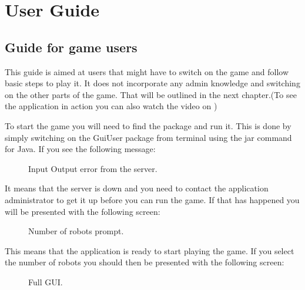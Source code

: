 \chapter{User Guide}
	\section{Guide for game users}
	This guide is aimed at users that might have to switch on the game and follow basic steps to play it. It does not incorporate any admin knowledge and switching on the other parts of the game. That will be outlined in the next chapter.(To see the application in action you can also watch the video on \cite{Dialogue full implementation})

	To start the game you will need to find the package and run it. This is done by simply switching on the GuiUser package from terminal using the jar command for Java. If you see the following message: 

	\begin{figure}[htp]
		\centering
		\caption{Input Output error from the server.}
	\end{figure}

	It means that the server is down and you need to contact the application administrator to get it up before you can run the game. If that has happened you will be presented with the following screen:

	\begin{figure}[htp]
		\centering
		\caption{Number of robots prompt.}
	\end{figure}

	This means that the application is ready to start playing the game. If you select the number of robots you should then be presented with the following screen:

	\begin{figure}[htp]
		\centering
		\caption{Full GUI.}
	\end{figure}

